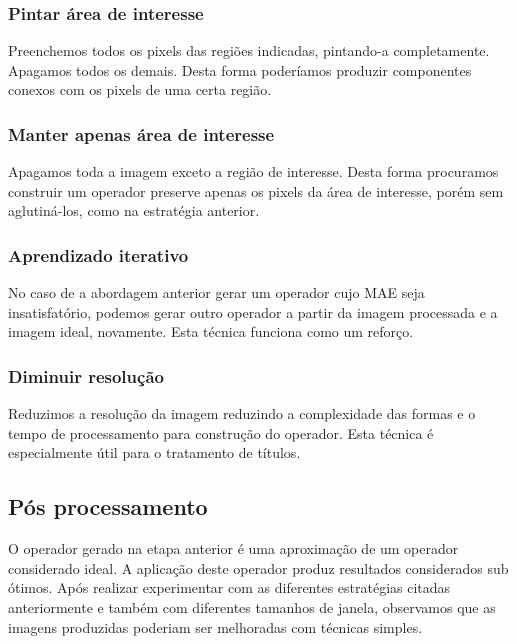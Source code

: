 \documentclass[a4paper,11pt]{article}
\begin{document}
      \subsubsection{Pintar área de interesse}

        Preenchemos todos os pixels das regiões indicadas, pintando-a completamente. Apagamos todos os demais. Desta forma poderíamos produzir componentes conexos com os pixels de uma certa região.

      \subsubsection{Manter apenas área de interesse}

        Apagamos toda a imagem exceto a região de interesse. Desta forma procuramos construir um operador preserve apenas os pixels da área de interesse, porém sem aglutiná-los, como na estratégia anterior.

      \subsubsection{Aprendizado iterativo}

        No caso de a abordagem anterior gerar um operador cujo MAE seja insatisfatório, podemos gerar outro operador a partir da imagem processada e a imagem ideal, novamente. Esta técnica funciona como um reforço.

      \subsubsection{Diminuir resolução}

        Reduzimos a resolução da imagem reduzindo a complexidade das formas e o tempo de processamento para construção do operador. Esta técnica é especialmente útil para o tratamento de títulos.

    \subsection{Pós processamento}

      O operador gerado na etapa anterior é uma aproximação de um operador considerado ideal. A aplicação deste operador produz resultados considerados sub ótimos. Após realizar experimentar com as diferentes estratégias citadas anteriormente e também com diferentes tamanhos de janela, observamos que as imagens produzidas poderiam ser melhoradas com técnicas simples.
\end{document}
